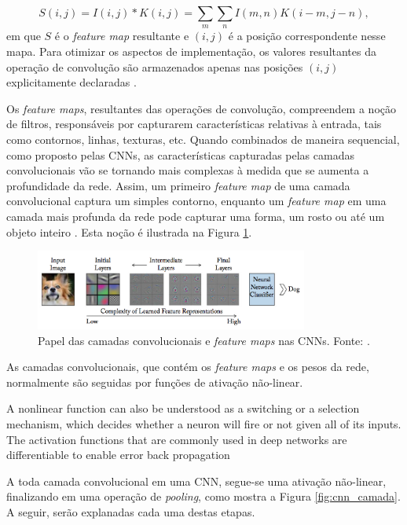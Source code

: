 \begin{equation}
 S(i,j) = I(i,j)*K(i,j) = \sum_{m}\sum_{n}I(m,n)K(i-m,j-n),\label{eq:conv_img}
\end{equation}
em que $S$ é o \emph{feature map} resultante e $(i,j)$ é a posição correspondente nesse mapa. Para otimizar os aspectos de implementação, os valores resultantes da operação de convolução são armazenados apenas nas posições $(i,j)$ explicitamente declaradas \cite{goodfellow2016deep}.

Os \emph{feature maps}, resultantes das operações de convolução, compreendem a noção de filtros, responsáveis por capturarem características relativas à entrada, tais como contornos, linhas, texturas, etc. Quando combinados de maneira sequencial, como proposto pelas CNNs, as características capturadas pelas camadas convolucionais vão se tornando mais complexas à medida que se aumenta a profundidade da rede. Assim, um primeiro \emph{feature map} de uma camada convolucional captura um simples contorno, enquanto um \emph{feature map} em uma camada mais profunda da rede pode capturar uma forma, um rosto ou até um objeto inteiro \cite{Buduma:Livro}. Esta noção é ilustrada na Figura \ref{fig:convolutions}.

\begin{figure}[!h]
	\centering
	\caption{Papel das camadas convolucionais e \emph{feature maps} nas CNNs. Fonte: \cite{Khan:Livro}.}
	\label{fig:convolutions}
	\includegraphics[width=0.8\textwidth]{./img/fundamenta/convolutions}
\end{figure}

As camadas convolucionais, que contém os \emph{feature maps} e os pesos da rede, normalmente são seguidas por funções de ativação não-linear.


A nonlinear function can also be understood as a switching or a selection mechanism, which decides whether a neuron will ﬁre or not given all of its inputs. The activation functions that are commonly used in deep networks are diﬀerentiable to enable error back propagation

A toda camada convolucional em uma CNN, segue-se uma ativação não-linear, finalizando em uma operação de \emph{pooling}, como mostra a Figura \ref{fig:cnn_camada}. A seguir, serão explanadas cada uma destas etapas.


